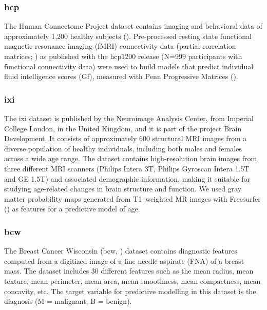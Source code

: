 \documentclass{article}
\begin{document}
\subsubsection{\textbf{\acrshort{hcp}}}

The Human Connectome Project dataset contains imaging and behavioral data of approximately 1,200 healthy subjects (\cite{Van_Essen_2013}). Pre-processed resting state functional magnetic resonance imaging (fMRI) connectivity data (partial correlation matrices; \cite{Glasser_2013}) as published with the \acrshort{hcp}1200 release (N=999 participants with functional connectivity data) were used to build models that predict individual fluid intelligence scores (Gf), measured with Penn Progressive Matrices (\cite{Duncan_2000}).

\subsubsection{\textbf{\acrshort{ixi}}}

The \acrshort{ixi} dataset is published by the Neuroimage Analysis Center, from Imperial College London, in the United Kingdom, and it is part of the project Brain Development. It consists of approximately 600 structural MRI images from a diverse population of healthy individuals, including both males and females across a wide age range. The dataset contains high-resolution brain images from three different MRI scanners (Philips Intera 3T, Philips Gyroscan Intera 1.5T and GE 1.5T) and associated demographic information, making it suitable for studying age-related changes in brain structure and function. We used gray matter probability maps generated from T1--weighted MR images with Freesurfer (\cite{Fischl_2012}) as features for a predictive model of age.

\subsubsection{\textbf{\acrshort{bcw}}}

The Breast Cancer Wisconsin (\acrshort{bcw}, \cite{Street_1993}) dataset contains diagnostic features computed from a digitized image of a fine needle aspirate (FNA) of a breast mass. The dataset includes 30 different features such as the mean radius, mean texture, mean perimeter, mean area, mean smoothness, mean compactness, mean concavity, etc. The target variable for predictive modelling in this dataset is the diagnosis (M = malignant, B = benign).
\end{document}
